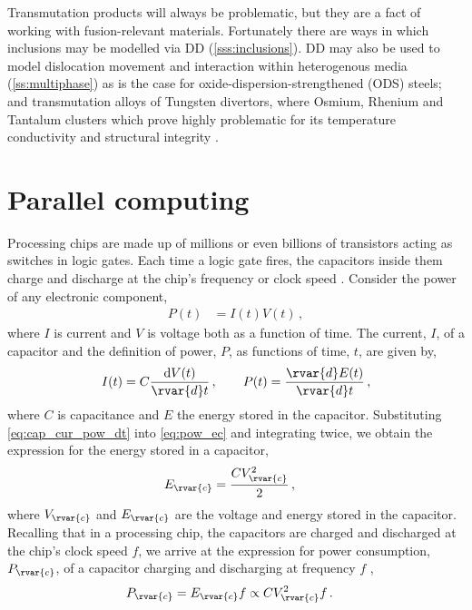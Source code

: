 Transmutation products will always be problematic, but they are a fact of working with fusion-relevant materials. Fortunately there are ways in which inclusions may be modelled via DD (\cref{sss:inclusions}). DD may also be used to model dislocation movement and interaction within heterogenous media (\cref{ss:multiphase}) as is the case for oxide-dispersion-strengthened (ODS) steels; and transmutation alloys of Tungsten divertors, where Osmium, Rhenium and Tantalum clusters which prove highly problematic for its temperature conductivity and structural integrity \cite{w_cluster1, nirrprop, nirpropmic, nirrmic, ionirrmic, ionirrprop, ionirrprop2}.

\section{Parallel computing}
\label{s:parallel_comp}
Processing chips are made up of millions or even billions of transistors acting as switches in logic gates. Each time a logic gate fires, the capacitors inside them charge and discharge at the chip's frequency or clock speed \cite{cpu_trnstor}. Consider the power of any electronic component,
\begin{align}
    P(t) & = I(t) V(t) \label{eq:pow_ec} \,,
\end{align}
where $ I $ is current and $ V $ is voltage both as a function of time. The current, $ I $, of a capacitor and the definition of power, $ P $, as functions of time, $ t $, are given by,
\begin{align}
    I(t) = C \dfrac{\mathrm{d}V(t)}{\rvar{d}t} \label{eq:cap_cur_pow_dt}\,, \qquad
    P(t) = \dfrac{\rvar{d}E(t)}{\rvar{d}t}\,,
\end{align}
where $ C $ is capacitance and $ E $ the energy stored in the capacitor. Substituting \cref{eq:cap_cur_pow_dt} into \cref{eq:pow_ec} and integrating twice, we obtain the expression for the energy stored in a capacitor,
\begin{align}
    E_{\rvar{c}} & = \dfrac{C V_{\rvar{c}}^{2}}{2} \label{eq:e_cap}\,,
\end{align}
where $ V_{\rvar{c}} $ and $ E_{\rvar{c}} $ are the voltage and energy stored in the capacitor. Recalling that in a processing chip, the capacitors are charged and discharged at the chip's clock speed $ f $, we arrive at the expression for power consumption, $ P_{\rvar{c}} $, of a capacitor charging and discharging at frequency $ f $ \cite{microelec},
\begin{align}
    P_{\rvar{c}} & = E_{\rvar{c}} f \propto C V_{\rvar{c}}^{2} f \label{eq:p_cap}\,.
\end{align}

